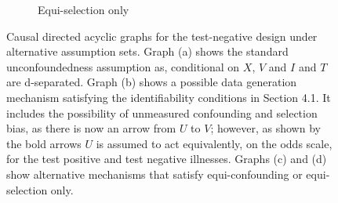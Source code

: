 \documentclass[11pt]{article}
\begin{document}
\begin{landscape}
\begin{figure}[p]
\begin{subfigure}{0.49\linewidth}
\begin{tikzpicture}[> = stealth, shorten > = 1pt, auto, node distance = 2.25cm, inner sep = 0pt,minimum size = 0.5pt, semithick]
            \end{tikzpicture}
        \caption{Equi-selection only}
        \end{subfigure}
        \caption{Causal directed acyclic graphs for the test-negative design under alternative assumption sets. Graph (a) shows the standard unconfoundedness assumption as, conditional on $X$, $V$ and $I$ and $T$ are d-separated. Graph (b) shows a possible data generation mechanism satisfying the identifiability conditions in Section 4.1. It includes the possibility of unmeasured confounding and selection bias, as there is now an arrow from $U$ to $V$; however, as shown by the bold arrows $U$ is assumed to act equivalently, on the odds scale, for the test positive and test negative illnesses. Graphs (c) and (d) show alternative mechanisms that satisfy equi-confounding or equi-selection only.}\label{fig:dags}
    \end{figure}
    \end{landscape}
\end{document}
